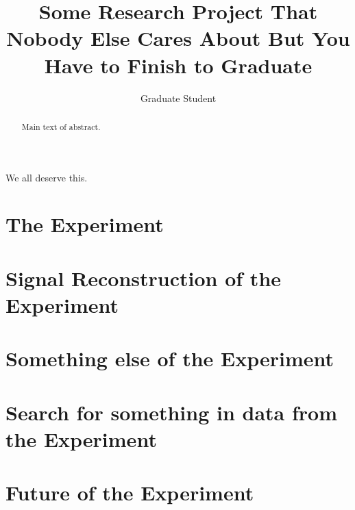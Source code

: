 \documentclass[letterpaper,12pt,twoside]{ruthesis}
\title{Some Research Project That Nobody Else Cares About But You Have to Finish to Graduate}
\author{Graduate Student}
\begin{document}
\begin{frontmatter}
\maketitle
\begin{abstract}
    Main text of abstract.
\end{abstract}
% 
\begin{acknowledge}
    We all deserve this. 
\end{acknowledge}
\tableofcontents
\end{frontmatter}
  
  




\chapter{The Experiment}

\chapter{Signal Reconstruction of the Experiment}

\chapter{Something else of the Experiment}

\chapter{Search for something in data from the Experiment}

\chapter{Future of the Experiment}


\nocite{*}

\printbibliography
\end{document}

